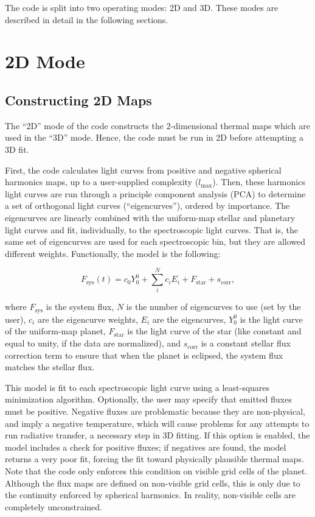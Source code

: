 \documentclass[12pt]{article}
\begin{document}
The code is split into two operating modes: 2D and 3D. These modes are
described in detail in the following sections. 

\section{2D Mode}

\subsection{Constructing 2D Maps}

The ``2D'' mode of the code constructs the 2-dimensional thermal maps
which are used in the ``3D'' mode. Hence, the code must be run in 2D
before attempting a 3D fit.

First, the code calculates light curves from positive and negative
spherical harmonics maps, up to a user-supplied complexity
($l_{\textrm{max}}$). Then, these harmonics light curves are run
through a principle component analysis (PCA) to determine a set of
orthogonal light curves (``eigencurves''), ordered by importance. The
eigencurves are linearly combined with the uniform-map stellar and
planetary light curves and fit, individually, to the spectroscopic
light curves. That is, the same set of eigencurves are used for each
spectroscopic bin, but they are allowed different
weights. Functionally, the model is the following:

\begin{equation}
  F_{\textrm{sys}}(t) = c_0 Y_0^0 + \sum_i^N c_i E_i + F_{\textrm{star}} + s_{\textrm{corr}},
\end{equation}

\noindent
where $F_{\textrm{sys}}$ is the system flux, $N$ is the number of
eigencurves to use (set by the user), $c_i$ are the eigencurve
weights, $E_i$ are the eigencurves, $Y_0^0$ is the light curve of the
uniform-map planet, $F_{\textrm{star}}$ is the light curve of the star
(like constant and equal to unity, if the data are normalized), and
$s_{\textrm{corr}}$ is a constant stellar flux correction term to
ensure that when the planet is eclipsed, the system flux matches the
stellar flux.

This model is fit to each spectroscopic light curve using a
least-squares minimization algorithm. Optionally, the user may specify
that emitted fluxes must be positive. Negative fluxes are problematic
because they are non-physical, and imply a negative temperature, which
will cause problems for any attempts to run radiative transfer, a
necessary step in 3D fitting. If this option is enabled, the model
includes a check for positive fluxes; if negatives are found, the
model returns a very poor fit, forcing the fit toward physically
plausible thermal maps. Note that the code only enforces this
condition on visible grid cells of the planet. Although the flux maps
are defined on non-visible grid cells, this is only due to the
continuity enforced by spherical harmonics. In reality, non-visible
cells are completely unconstrained.
\end{document}

